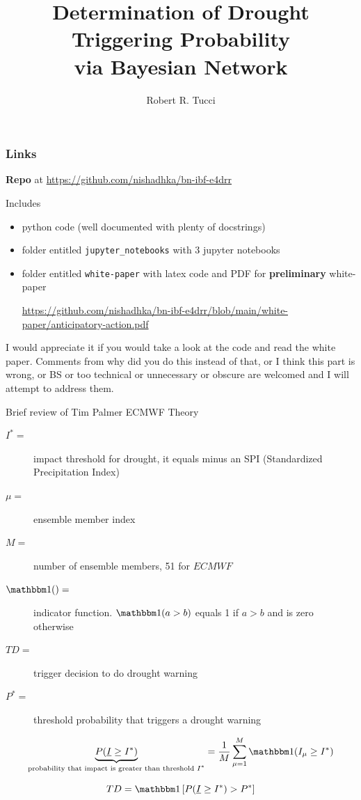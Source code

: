 \documentclass{beamer}
\title{Determination of Drought Triggering Probability \\via Bayesian Network}
\author{Robert R. Tucci}
\institute{ICPAC, www.ar-tiste.xyz}
\begin{document}
\begin{frame}
\titlepage
\end{frame}

\begin{frame}
\frametitle{Links}


{\bf Repo} at
{\tiny \url{https://github.com/nishadhka/bn-ibf-e4drr} }

Includes
\begin{itemize}
\item python code (well documented with plenty of docstrings)
\item folder entitled {\tt jupyter\_notebooks} with 3 jupyter notebooks
\item folder entitled {\tt white-paper} with latex code and PDF for {\bf preliminary} white-paper 

{\tiny \url{https://github.com/nishadhka/bn-ibf-e4drr/blob/main/white-paper/anticipatory-action.pdf}}
\end{itemize}

I would appreciate it if you would take a look at the code and read the white paper. Comments from {\color{red} why did you do this instead of that}, or {\color{red} I think this part is wrong, or BS or too technical or unnecessary or obscure} are welcomed and I will attempt to address them.
\end{frame}

\begin{frame}{Brief review of Tim Palmer ECMWF Theory}

\begin{description}
\item[$I^*  =$] impact threshold 
   for drought, it equals minus an SPI (Standardized Precipitation Index)
   
\item[$\mu=$] ensemble member index

\item[$M=$] number of ensemble members, 51 for $ECMWF$

\item[$\indi()=$] indicator function. $\indi(a>b)$
equals 1 if $a>b$ and is zero otherwise

\item[$TD=$] trigger decision to do drought warning
\item[$P^*=$] threshold probability that triggers a  drought warning

\end{description}

$$
\underbrace{P(\rvI\geq I^*  )}_{
\text{probability that impact is greater than threshold $I^*$}}= \frac{1}{M} \sum_{\mu=1}^{M} \indi(I_{\mu} \geq I^*) 
$$



$$
TD=
\indi\left[P(\rvI\geq I^*  ) > P^*\right]
$$
\end{frame}
\end{document}
